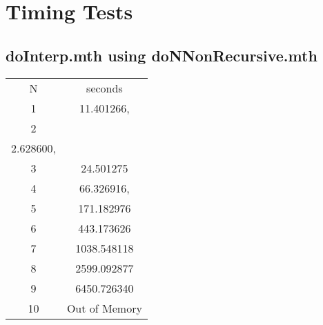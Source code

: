 \documentclass[12pt]{article}
\begin{document}
\section{Timing Tests}
\label{sec:timing-tests}

\subsection{doInterp.mth using doNNonRecursive.mth}
\label{sec:doint-using-donn}

\begin{tabular}{|c|c|}
N&seconds\\
1&11.401266,\\
2\\2.628600,\\
3&24.501275\\
4&66.326916,\\
5&171.182976\\
6&443.173626\\
7&1038.548118\\
8&2599.092877\\
9&6450.726340\\
10&Out of Memory
\end{tabular}




\end{document}
